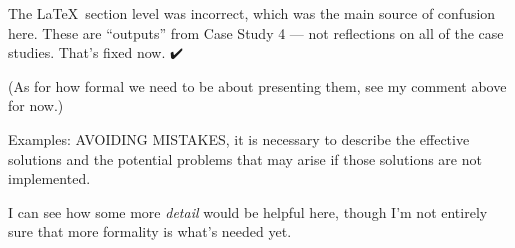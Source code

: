 \documentclass[acmlarge,timestamp]{acmart}
\begin{document}
\begin{rightbubbles}
The \LaTeX\ section level was incorrect, which was the main source of
confusion here.  These are “outputs” from Case Study 4 — not
reflections on all of the case studies.  That’s fixed now.  {\huge ✔️}

(As for how formal we need to be about presenting them, see my comment
above for now.)
\end{rightbubbles}

\begin{leftbubbles}
Examples: AVOIDING MISTAKES, it is necessary to describe the effective
solutions and the potential problems that may arise if those solutions
are not implemented.
\end{leftbubbles}

\begin{rightbubbles}
I can see how some more \emph{detail} would be helpful here, though
I’m not entirely sure that more formality is what’s needed yet.  {\huge 🤔}
\end{rightbubbles}
\end{document}

